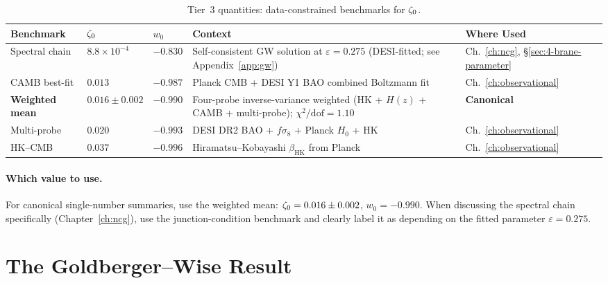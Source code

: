 \begin{table}[h!]
\caption{Tier~3 quantities: data-constrained benchmarks for $\zeta_0$.}
\label{tab:val-tier3}
\small
\renewcommand{\arraystretch}{1.25}
\begin{tabular}{@{}p{3.5cm}p{2.2cm}p{1.8cm}p{4.5cm}p{2.5cm}@{}}
\toprule
\textbf{Benchmark} & \textbf{$\zeta_0$} & \textbf{$w_0$} & \textbf{Context} & \textbf{Where Used} \\
\midrule

Spectral chain &
$8.8 \times 10^{-4}$ &
$-0.830$ &
Self-consistent GW solution at $\varepsilon = 0.275$ (DESI-fitted; see Appendix~\ref{app:gw}) &
Ch.~\ref{ch:ncg}, \S\ref{sec:4-brane-parameter} \\

CAMB best-fit &
$0.013$ &
$-0.987$ &
Planck CMB + DESI Y1 BAO combined Boltzmann fit &
Ch.~\ref{ch:observational} \\

\textbf{Weighted mean} &
$\mathbf{0.016 \pm 0.002}$ &
$\mathbf{-0.990}$ &
Four-probe inverse-variance weighted (HK + $H(z)$ + CAMB + multi-probe); $\chi^2/\mathrm{dof} = 1.10$ &
\textbf{Canonical} \\

Multi-probe &
$0.020$ &
$-0.993$ &
DESI DR2 BAO + $f\sigma_8$ + Planck $H_0$ + HK &
Ch.~\ref{ch:observational} \\

HK--CMB &
$0.037$ &
$-0.996$ &
Hiramatsu--Kobayashi $\beta_\mathrm{HK}$ from Planck &
Ch.~\ref{ch:observational} \\

\bottomrule
\end{tabular}
\end{table}

\paragraph{Which value to use.}
For canonical single-number summaries, use the weighted mean: $\zeta_0 = 0.016 \pm 0.002$, $w_0 = -0.990$. When discussing the spectral chain specifically (Chapter~\ref{ch:ncg}), use the junction-condition benchmark and clearly label it as depending on the fitted parameter $\varepsilon = 0.275$.

\section{The Goldberger--Wise Result}
\label{app:val-gw-note}

